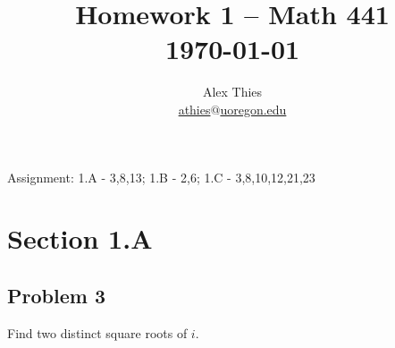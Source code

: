 \documentclass[letterpaper, 12pt]{amsart}
\theoremstyle{definition}  %
\begin{document}
	\title{Homework 1  -- Math 441 \\ \today}
	\author{Alex Thies \\ \href{mailto:athies@uoregon.edu}{\lowercase{athies$@$uoregon.edu}}}

	\maketitle

	Assignment: 1.A - 3,8,13; 1.B - 2,6; 1.C - 3,8,10,12,21,23

	\section*{Section 1.A}
		\subsection*{Problem 3}
		Find two distinct square roots of $i$.
\end{document}
